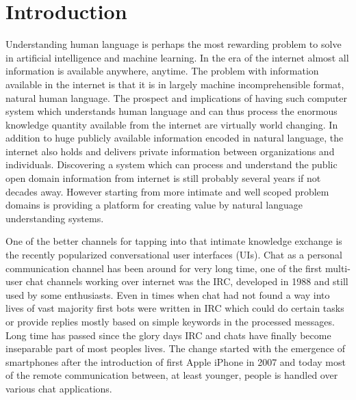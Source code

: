 \documentclass[12pt,a4paper,english
]{tutthesis}
\begin{document}
\chapter{Introduction}
\label{ch:intro}
Understanding human language is perhaps the most rewarding problem to solve in artificial intelligence and machine learning. In the era of the internet almost all information is available anywhere, anytime. The problem with information available in the internet is that it is in largely machine incomprehensible format, natural human language. The prospect and implications of having such computer system which understands human language and can thus process the enormous knowledge quantity available from the internet are  virtually world changing. In addition to huge publicly available information encoded in natural language, the internet also holds and delivers private information between organizations and individuals. Discovering a system which can process and understand the public open domain information from internet is still probably several years if not decades away. However starting from more intimate and well scoped problem domains is providing a platform for creating value by natural language understanding systems.

One of the better channels for tapping into that intimate knowledge exchange is the recently popularized conversational user interfaces (UIs). Chat as a personal communication channel has been around for very long time, one of the first multi-user chat channels working over internet was the IRC, developed in 1988 and still used by some enthusiasts. Even in times when chat had not found a way into lives of vast majority first bots were written in IRC which could do certain tasks or provide replies mostly based on simple keywords in the processed messages. Long time has passed since the glory days IRC and chats have finally become inseparable part of most peoples lives. The change started with the emergence of smartphones after the introduction of first Apple iPhone in 2007 and today most of the remote communication between, at least younger, people is handled over various chat applications.
\end{document}
